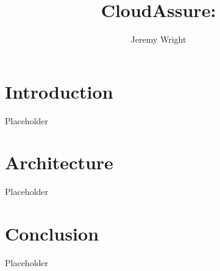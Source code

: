 \documentclass[12pt]{article}
\title{CloudAssure: }
\author{Jeremy Wright}
\begin{document}
\maketitle


\section{Introduction}
Placeholder \autocite{Cisco}
\section{Architecture}
Placeholder

\section{Conclusion}
Placeholder

\printbibliography
\end{document}
